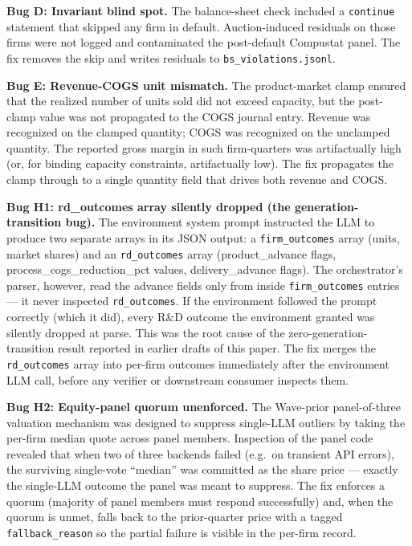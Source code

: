 \documentclass[11pt]{article}
\begin{document}
\textbf{Bug D: Invariant blind spot.} The balance-sheet check
included a \texttt{continue} statement that skipped any firm in
default. Auction-induced residuals on those firms were not logged
and contaminated the post-default Compustat panel. The fix removes
the skip and writes residuals to \texttt{bs\_violations.jsonl}.

\textbf{Bug E: Revenue-COGS unit mismatch.} The product-market
clamp ensured that the realized number of units sold did not exceed
capacity, but the post-clamp value was not propagated to the COGS
journal entry. Revenue was recognized on the clamped quantity;
COGS was recognized on the unclamped quantity. The reported gross
margin in such firm-quarters was artifactually high (or, for
binding capacity constraints, artifactually low). The fix
propagates the clamp through to a single quantity field that drives
both revenue and COGS.

\textbf{Bug H1: rd\_outcomes array silently dropped (the
generation-transition bug).} The environment system prompt instructed
the LLM to produce two separate arrays in its JSON output: a
\texttt{firm\_outcomes} array (units, market shares) and an
\texttt{rd\_outcomes} array (product\_advance flags,
process\_cogs\_reduction\_pct values, delivery\_advance flags). The
orchestrator's parser, however, read the advance fields only from
inside \texttt{firm\_outcomes} entries — it never inspected
\texttt{rd\_outcomes}. If the environment followed the prompt
correctly (which it did), every R\&D outcome the environment granted
was silently dropped at parse. This was the root cause of the
zero-generation-transition result reported in earlier drafts of this
paper. The fix merges the \texttt{rd\_outcomes} array into per-firm
outcomes immediately after the environment LLM call, before any
verifier or downstream consumer inspects them.

\textbf{Bug H2: Equity-panel quorum unenforced.} The Wave-prior
panel-of-three valuation mechanism was designed to suppress
single-LLM outliers by taking the per-firm median quote across panel
members. Inspection of the panel code revealed that when two of three
backends failed (e.g.\ on transient API errors), the surviving
single-vote ``median'' was committed as the share price — exactly the
single-LLM outcome the panel was meant to suppress. The fix enforces
a quorum (majority of panel members must respond successfully) and,
when the quorum is unmet, falls back to the prior-quarter price with
a tagged \texttt{fallback\_reason} so the partial failure is visible
in the per-firm record.
\end{document}
